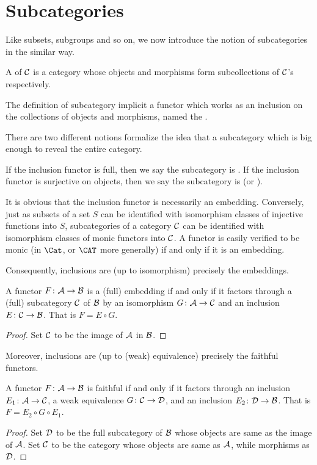 \newpage\section{Subcategories}
  Like subsets, subgroups and so on, we now introduce the notion of subcategories in the similar way.
  \begin{defn}
    A  of ${\cal C}$ is a category whose objects and morphisms form subcollections of ${\cal C}$'s respectively.
  \end{defn}
    The definition of subcategory implicit a functor which works as an inclusion on the collections of objects and morphisms, named the .

  There are two different notions formalize the idea that a subcategory which is big enough to reveal the entire category.
  \begin{defn}
    If the inclusion functor is full, then we say the subcategory is .
    If the inclusion functor is surjective on objects, then we say the subcategory is  (or ).
  \end{defn}

  It is obvious that the inclusion functor is necessarily an embedding.
  Conversely,
  just as subsets of a set $S$ can be identified with isomorphism classes of injective functions into $S$, subcategories of a category ${\cal C}$ can be identified with isomorphism classes of monic functors into ${\cal C}$.
  A functor is easily verified to be monic (in $\Cat$, or $\CAT$ more generally) if and only if it is an embedding.

  Consequently, inclusions are (up to isomorphism) precisely the embeddings.
  \begin{prop}
    A functor $F\colon {\cal A} \to {\cal B}$ is a (full) embedding if and only if it factors through a (full) subcategory ${\cal C}$ of ${\cal B}$ by an isomorphism $G\colon {\cal A} \to {\cal C}$ and an inclusion $E\colon {\cal C} \to {\cal B}$. That is $F=E\circ G$.
  \end{prop}
  \begin{proof}
    Set ${\cal C}$ to be the image of ${\cal A}$ in ${\cal B}$.
  \end{proof}
  Moreover, inclusions are (up to (weak) equivalence) precisely the faithful functors.
  \begin{prop}
    A functor $F\colon {\cal A} \to {\cal B}$ is faithful if and only if it factors through an inclusion $E_1\colon{\cal A}\to{\cal C}$, a weak equivalence $G\colon{\cal C}\to{\cal D}$, and an inclusion $E_2\colon{\cal D}\to{\cal B}$. That is $F=E_2\circ G\circ E_1$.
  \end{prop}
  \begin{proof}
    Set ${\cal D}$ to be the full subcategory of ${\cal B}$ whose objects are same as the image of ${\cal A}$.
    Set ${\cal C}$ to be the category whose objects are same as ${\cal A}$, while morphisms as ${\cal D}$.
  \end{proof}

